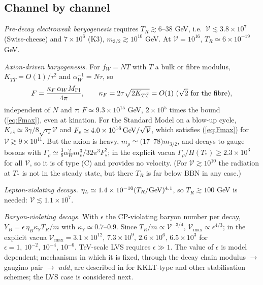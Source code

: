 \documentclass[11pt]{article}
\newcommand{\Mpl}{M_{\rm Pl}}
\newcommand{\vol}{\mathcal{V}}
\begin{document}
\subsection{Channel by channel}
\emph{Pre-decay electroweak baryogenesis} requires $T_R\gtrsim6$--$38$ GeV, i.e.\ $\vol\lesssim3.8\times10^7$ (Swiss-cheese) and $7\times10^6$ (K3), $m_{3/2}\gtrsim10^{10}$ GeV. At $\vol=10^{16}$, $T_R\simeq6\times10^{-19}$ GeV.

\emph{Axion-driven baryogenesis.} For $f_W=NT$ with $T$ a bulk or fibre modulus, $K_{T\bar T}=O(1)/\tau^2$ and $\alpha_W^{-1}=N\tau$, so
\begin{equation}
F=\frac{\kappa_F\,\alpha_W\Mpl}{4\pi},\qquad\kappa_F=2\tau\sqrt{2K_{T\bar T}}=O(1)\ (\sqrt2\ \text{for the fibre}),
\end{equation}
independent of $N$ and $\tau$: $F\simeq9.3\times10^{15}$ GeV, $2\times10^5$ times the bound (\ref{eq:Fmax}), even at kination. For the Standard Model on a blow-up cycle, $K_{s\bar s}\simeq3\gamma/8\sqrt{\tau_s}\vol$ and $F_s\simeq4.0\times10^{16}\,{\rm GeV}/\sqrt{\vol}$, which satisfies (\ref{eq:Fmax}) for $\vol\gtrsim9\times10^{11}$. But the axion is heavy, $m_\rho\simeq(17$--$78)m_{3/2}$, and decays to gauge bosons with $\Gamma_\rho\simeq\tfrac38\alpha_W^2m_\rho^3/32\pi^3F_s^2$; in the explicit vacua $\Gamma_\rho/H(T_*)\ge2.3\times10^3$ for all $\vol$, so it is of type (C) and provides no velocity. (For $\vol\gtrsim10^{10}$ the radiation at $T_*$ is not in the steady state, but there $T_R$ is far below BBN in any case.)

\emph{Lepton-violating decays.} $\eta_L\simeq1.4\times10^{-10}(T_R/{\rm GeV})^{4.1}$, so $T_R\gtrsim100$ GeV is needed: $\vol\lesssim1.1\times10^7$.

\emph{Baryon-violating decays.} With $\epsilon$ the CP-violating baryon number per decay, $Y_B=\epsilon\,\eta_B\kappa_YT_R/m$ with $\kappa_Y\simeq0.7$--$0.9$. Since $T_R/m\propto\vol^{-3/4}$, $\vol_{\max}\propto\epsilon^{4/3}$; in the explicit vacua $\vol_{\max}=3.1\times10^{12},\,7.3\times10^9,\,2.6\times10^6,\,6.5\times10^3$ for $\epsilon=1,\,10^{-2},\,10^{-4},\,10^{-6}$. TeV-scale LVS requires $\epsilon\gg1$. The value of $\epsilon$ is model dependent; mechanisms in which it is fixed, through the decay chain modulus $\to$ gaugino pair $\to$ $udd$, are described in \cite{IJT,KW} for KKLT-type and other stabilisation schemes; the LVS case is considered next.
\end{document}
